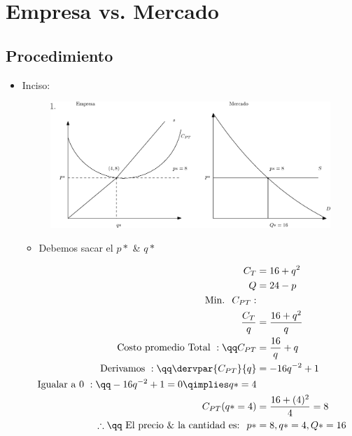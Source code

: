 \section{Empresa vs. Mercado}
\begin{figure}
    \centering
\end{figure}

\subsection{Procedimiento}
\begin{itemize}
    \item Inciso:
        \begin{center}
            \begin{figure}[!htb]
                \centering
                \includegraphics[width=18cm]{./Clases/figs/01.eps}
            \end{figure}
        \end{center}
        \begin{itemize}                
        \item Debemos sacar el $p*$ \& $q*$ 
        \end{itemize}
        \begin{center}
           \begin{align*}
               C_T &= 16 + q^2 \\ 
               Q &= 24 - p \\ 
               \text{ Min.  }\; C_{PT}: \\ 
                    \frac{C_T}{q} &= \frac{16+q^2}{q} \\ 
                    \text{ Costo promedio Total }: \qq C_{PT} &= \frac{16}{q} + q \\ 
                    \text{ Derivamos }: \qq   
                        \dervpar{C_{PT}}{q} &= -16q^{-2} + 1 \\  
                        \text{ Igualar a 0 }: \qq  -16q^{-2} + 1 = 0 \qimplies q* = 4 \\ 
                C_{PT}(q*=4) &= \frac{16+(4)^2}{4} = 8 \\  
                \therefore \qq \text{ El precio \&  la cantidad es:  }\; p*&=8, q*=4, Q*=16 \\ 
           \end{align*}
        \end{center}
    

\end{itemize}

